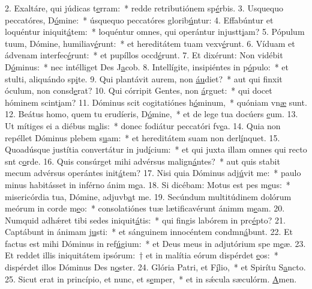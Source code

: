 2. Exaltáre, qui júdicas t\uline{e}rram:~* redde retributiónem sp\uline{é}rbis.
3. Usquequo peccatóres, D\uline{ó}mine:~* úsquequo peccatóres glorib\uline{ú}ntur:
4. Effabúntur et loquéntur iniquit\uline{á}tem:~* loquéntur omnes, qui operántur injustt\uline{i}am?
5. Pópulum tuum, Dómine, humiliav\uline{é}runt:~* et hereditátem tuam vexv\uline{é}runt.
6. Víduam et ádvenam interfec\uline{é}runt:~* et pupíllos occd\uline{é}runt.
7. Et dixérunt: Non vidébit D\uline{ó}minus:~* nec intélliget Des J\uline{a}cob.
8. Intellígite, insipiéntes in p\uline{ó}pulo:~* et stulti, aliquándo sp\uline{i}te.
9. Qui plantávit aurem, non \uline{áu}diet?~* aut qui finxit óculum, non consd\uline{e}rat?
10. Qui córripit Gentes, non \uline{á}rguet:~* qui docet hóminem scint\uline{i}am?
11. Dóminus scit cogitatiónes h\uline{ó}minum,~* quóniam vn\uline{æ} sunt.
12. Beátus homo, quem tu erudíeris, D\uline{ó}mine,~* et de lege tua docúers \uline{e}um.
13. Ut mítiges ei a diébus m\uline{a}lis:~* donec fodiátur peccatóri fv\uline{e}a.
14. Quia non repéllet Dóminus plebem s\uline{u}am:~* et hereditátem suam non derl\uline{í}nquet.
15. Quoadúsque justítia convertátur in jud\uline{í}cium:~* et qui juxta illam omnes qui recto snt c\uline{o}rde.
16. Quis consúrget mihi advérsus malign\uline{á}ntes?~* aut quis stabit mecum advérsus operántes init\uline{á}tem?
17. Nisi quia Dóminus adj\uline{ú}vit me:~* paulo minus habitásset in inférno ánim m\uline{e}a.
18. Si dicébam: Motus est pes m\uline{e}us:~* misericórdia tua, Dómine, adjuvb\uline{a}t me.
19. Secúndum multitúdinem dolórum meórum in corde m\uline{e}o:~* consolatiónes tuæ lætificavérunt ánimm m\uline{e}am.
20. Numquid adhǽret tibi sedes iniquit\uline{á}tis:~* qui fingis labórem in prc\uline{é}pto?
21. Captábunt in ánimam j\uline{u}sti:~* et sánguinem innocéntem condmn\uline{á}bunt.
22. Et factus est mihi Dóminus in ref\uline{ú}gium:~* et Deus meus in adjutórium spe m\uline{e}æ.
23. Et reddet illis iniquitátem ipsórum:~† et in malítia eórum dispérdet \uline{e}os:~* dispérdet illos Dóminus Des n\uline{o}ster.
24. Glória Patri, et F\uline{í}lio,~* et Spirítu S\uline{a}ncto.
25. Sicut erat in princípio, et nunc, et s\uline{e}mper,~* et in sǽcula sæculórm. \uline{A}men.
